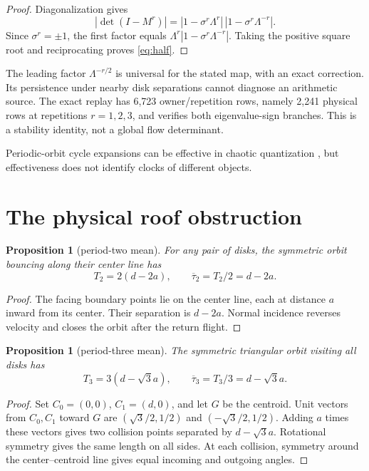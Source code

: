 \documentclass[11pt,a4paper]{article}
\newtheorem{proposition}[theorem]{Proposition}
\theoremstyle{definition}
\theoremstyle{remark}
\begin{document}
\begin{proof}
Diagonalization gives
\[
 |\det(I-M^r)|
 =|1-\sigma^r\Lambda^r|\,|1-\sigma^r\Lambda^{-r}|.
\]
Since \(\sigma^r=\pm1\), the first factor equals
\(\Lambda^r|1-\sigma^r\Lambda^{-r}|\). Taking the positive square root and reciprocating proves \cref{eq:half}.
\end{proof}

The leading factor \(\Lambda^{-r/2}\) is universal for the stated map, with an exact correction. Its persistence under nearby disk separations cannot diagnose an arithmetic source. The exact replay has 6,723 owner/repetition rows, namely 2,241 physical rows at repetitions \(r=1,2,3\), and verifies both eigenvalue-sign branches. This is a stability identity, not a global flow determinant.

Periodic-orbit cycle expansions can be effective in chaotic quantization \citep[pp.~823--826]{CvitanovicEckhardt1989}, but effectiveness does not identify clocks of different objects.

\section{The physical roof obstruction}

\begin{proposition}[period-two mean]\label{prop:t2}
For any pair of disks, the symmetric orbit bouncing along their center line has
\[
 T_2=2(d-2a),\qquad \overline{\tau}_2=T_2/2=d-2a.
\]
\end{proposition}
\begin{proof}
The facing boundary points lie on the center line, each at distance \(a\) inward from its center. Their separation is \(d-2a\). Normal incidence reverses velocity and closes the orbit after the return flight.
\end{proof}

\begin{proposition}[period-three mean]\label{prop:t3}
The symmetric triangular orbit visiting all disks has
\[
 T_3=3(d-\sqrt3a),\qquad \overline{\tau}_3=T_3/3=d-\sqrt3a.
\]
\end{proposition}
\begin{proof}
Set \(C_0=(0,0)\), \(C_1=(d,0)\), and let \(G\) be the centroid. Unit vectors from \(C_0,C_1\) toward \(G\) are
\((\sqrt3/2,1/2)\) and \((-\sqrt3/2,1/2)\). Adding \(a\) times these vectors gives two collision points separated by \(d-\sqrt3a\). Rotational symmetry gives the same length on all sides. At each collision, symmetry around the center--centroid line gives equal incoming and outgoing angles.
\end{proof}
\end{document}
